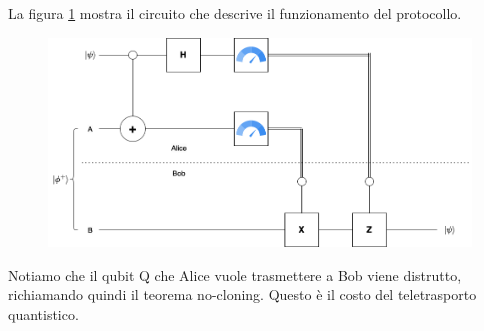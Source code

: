 La figura \ref{fig12} mostra il circuito che descrive il funzionamento del protocollo.
\begin{figure}[h]
    \centering
    \includegraphics[width = 12.1cm]{./Images/telepng.png}
    \caption{}
    \label{fig12}
\end{figure}
\begin{oss}{}{}
    Notiamo che il qubit Q che Alice vuole trasmettere a Bob viene distrutto, richiamando
    quindi il teorema no-cloning. Questo è il costo del teletrasporto quantistico.
\end{oss}

